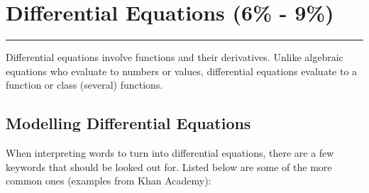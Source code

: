 \documentclass[12pt]{article}
\newcommand{\fline}{\par\noindent\rule{\textwidth}{0.1pt}} %
\begin{document}
\section{Differential Equations (6\% - 9\%)}
\fline

Differential equations involve functions and their derivatives. Unlike algebraic equations who evaluate to numbers or values, differential equations evaluate to a function or class (several) functions.

\subsection{Modelling Differential Equations}
When interpreting words to turn into differential equations, there are a few keywords that should be looked out for. Listed below are some of the more common ones (examples from Khan Academy):
\end{document}
